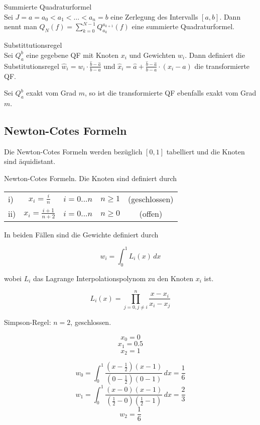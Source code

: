 \begin{definition}
	[Definition I.3] Summierte Quadraturformel
	\\
	Sei $J={a=a_{0}<a_{1}<\ldots <a_{n}=b}$ eine Zerlegung des Intervalls $[a,b]$. 
	Dann nennt man $Q_{N}(f)=\sum_{k=0}^{N-1}Q_{a_{k}}^{a_{k+1}}(f)$ eine summierte Quadraturformel.
	
\end{definition}
\begin{definition}
[Definition I.4] Substittutionsregel
\\
Sei $Q_{a}^{b}$ eine gegebene QF mit Knoten $x_{i}$ und Gewichten $w_{i}$. Dann definiert die Substitutionsregel
$\hat w_{i}=w_{i}\cdot\frac{\hat b-\hat a}{b-a}$ und $\hat x_{i}=\hat a+\frac{\hat b - \hat a}{b-a}\cdot(x_{i}-a)$
die transformierte QF.
\end{definition}
\begin{theorem}
[Satz I.2] Sei $Q_{a}^{b}$ exakt vom Grad $m$, so ist die transformierte QF ebenfalls exakt vom Grad $m$.
\end{theorem}
\subsection{Newton-Cotes Formeln}

Die Newton-Cotes Formeln werden bezüglich $[0, 1]$ tabelliert und die Knoten sind äquidistant.

\begin{definition}[Definition I.5] Newton-Cotes Formeln. Die Knoten sind definiert durch

	\begin{tabular}{ l c c c c }
		i) & $x_i = \frac{i}{n}$ & $i=0...n$ & $n \ge 1$ & (geschlossen) \\
		ii) & $x_i = \frac{i+1}{n+2}$ & $i=0...n$ & $n \ge 0$ & (offen) \\
	\end{tabular}
	
	In beiden Fällen sind die Gewichte definiert durch
	
	$$w_i = \int^1_0\!L_i(x) \,dx$$	
	
	wobei $L_i$ das Lagrange Interpolationspolynom zu den Knoten $x_i$ ist.
	
	$$L_i(x) = \prod_{j=0, j \ne i}^n \frac{x-x_i}{x_i-x_j}$$
\end{definition}

\begin{example} Simpson-Regel: $n=2$, geschlossen.

	$$x_0 = 0$$ 
	$$x_1 = 0.5$$
	$$x_2 = 1$$
	
	$$w_0 = \int_0^1\!\frac{(x-\frac{1}{2})(x-1)}{(0-\frac{1}{2})(0-1)}\,dx = \frac{1}{6}$$ 
	$$w_1 = \int_0^1\!\frac{(x-0)(x-1)}{(\frac{1}{2}-0)(\frac{1}{2}-1)}\,dx = \frac{2}{3}$$ 
	$$w_2 = \frac{1}{6}$$
	
\end{example}

